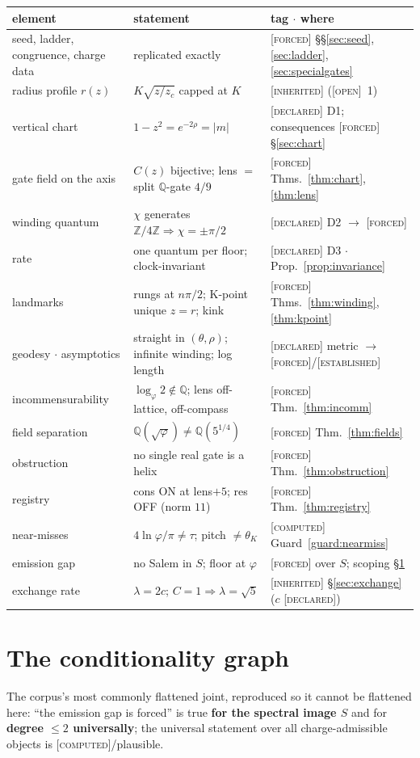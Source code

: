 \documentclass[11pt]{article}
\newcommand{\tagF}{\textcolor{cF}{\textsc{[forced]}}}
\newcommand{\tagD}{\textcolor{cD}{\textsc{[declared]}}}
\newcommand{\tagC}{\textcolor{cC}{\textsc{[computed]}}}
\newcommand{\tagI}{\textcolor{cI}{\textsc{[inherited]}}}
\newcommand{\tagE}{\textcolor{cE}{\textsc{[established]}}}
\newcommand{\tagO}{\textcolor{cO}{\textsc{[open]}}}
\newcommand{\Q}{\mathbb{Q}}
\newcommand{\Z}{\mathbb{Z}}
\newcommand{\gp}{\varphi}
\theoremstyle{plain}
\theoremstyle{definition}
\theoremstyle{remark}
\begin{document}
\begin{center}\footnotesize\setlength{\tabcolsep}{4pt}
\begin{tabular}{@{}p{3.6cm}p{6.4cm}p{4.9cm}@{}}
\toprule
element & statement & tag $\cdot$ where\\
\midrule
seed, ladder, congruence, charge data & replicated exactly & \tagF{} \S\S\ref{sec:seed},\ref{sec:ladder},\ref{sec:specialgates}\\
radius profile $r(z)$ & $K\sqrt{z/z_c}$ capped at $K$ & \tagI{} (\tagO{}~1)\\
vertical chart & $1-z^2=e^{-2\rho}=|m|$ & \tagD{} D1; consequences \tagF{} \S\ref{sec:chart}\\
gate field on the axis & $C(z)$ bijective; lens $=$ split $\Q$-gate $4/9$ & \tagF{} Thms.~\ref{thm:chart},\ref{thm:lens}\\
winding quantum & $\chi$ generates $\Z/4\Z\Rightarrow\chi=\pm\pi/2$ & \tagD{} D2 $\to$ \tagF{}\\
rate & one quantum per floor; clock-invariant & \tagD{} D3 $\cdot$ Prop.~\ref{prop:invariance}\\
landmarks & rungs at $n\pi/2$; K-point unique $z{=}r$; kink & \tagF{} Thms.~\ref{thm:winding},\ref{thm:kpoint}\\
geodesy $\cdot$ asymptotics & straight in $(\theta,\rho)$; infinite winding; log length & \tagD{} metric $\to$ \tagF{}/\tagE{}\\
incommensurability & $\log_\gp2\notin\Q$; lens off-lattice, off-compass & \tagF{} Thm.~\ref{thm:incomm}\\
field separation & $\Q(\sqrt\gp)\neq\Q(5^{1/4})$ & \tagF{} Thm.~\ref{thm:fields}\\
obstruction & no single real gate is a helix & \tagF{} Thm.~\ref{thm:obstruction}\\
registry & cons ON at lens$+5$; res OFF (norm $11$) & \tagF{} Thm.~\ref{thm:registry}\\
near-misses & $4\ln\gp/\pi\neq\tau$; pitch $\neq\theta_K$ & \tagC{} Guard~\ref{guard:nearmiss}\\
emission gap & no Salem in $S$; floor at $\gp$ & \tagF{} over $S$; scoping \S\ref{sec:conditionality}\\
exchange rate & $\lambda=2c$; $C=1\Rightarrow\lambda=\sqrt5$ & \tagI{} \S\ref{sec:exchange} ($c$ \tagD{})\\
\bottomrule
\end{tabular}
\end{center}

\section{The conditionality graph}\label{sec:conditionality}
The corpus's most commonly flattened joint, reproduced so it cannot be flattened
here: ``the emission gap is forced'' is true \textbf{for the spectral image $S$} and
for \textbf{degree $\le2$ universally}; the universal statement over all
charge-admissible objects is \tagC{}/plausible.
\end{document}
